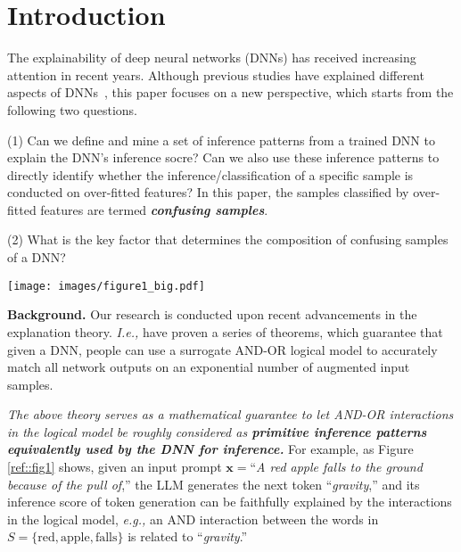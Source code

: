 \documentclass[10pt,twocolumn,letterpaper]{article}
\begin{document}
\section{Introduction}
The explainability of deep neural networks (DNNs) has received increasing attention in recent years. Although previous studies have explained different aspects of DNNs~\citep{dziugaite2017computing, foret2020sharpness, neyshabur2015norm}, this paper focuses on a new perspective, which starts from the following two questions.

(1) Can we define and mine a set of inference patterns from a trained DNN to explain the DNN's inference socre? Can we also use these inference patterns to directly identify whether the inference/classification of a specific sample is conducted on over-fitted features? In this paper, the samples classified by over-fitted features are termed \textbf{\textit{confusing samples}}.

(2) What is the key factor that determines the composition of confusing samples of a DNN?


\begin{figure*}[t]
    \centering
    \texttt{[image: images/figure1\_big.pdf]}
    \vspace{-5pt}
    \caption{\citet{ren2024we} have proven that we can construct a surrogate logical model $h(\mathbf{x})$ consisting of sparse AND-OR interactions, which can universally predict the DNN's inference scores $v(\mathbf{x})$ on an exponential number of masked states of the sample $\mathbf{x}$.}
    \vspace{-5pt}
    \label{ref::fig1}
\end{figure*}

\textbf{Background.} Our research is conducted upon recent advancements in the explanation theory. \emph{I.e.,} \citet{ren2024we} have proven a series of theorems, which guarantee that given a DNN, people can use a surrogate AND-OR logical model to accurately match all network outputs on an exponential number of augmented input samples.

\textit{The above theory serves as a mathematical guarantee to let AND-OR interactions in the logical model be roughly considered as \textbf{primitive inference patterns equivalently used by the DNN for inference.}} For example, as Figure \ref{ref::fig1} shows, given an input prompt $\mathbf{x}=$``\textit{A red apple falls to the ground because of the pull of},''
the LLM generates the next token ``\textit{gravity},'' and its inference score of token generation can be faithfully explained by the interactions in the logical model, \emph{e.g.,} an AND interaction between the words in $S=\{\text{red}, \text{apple}, \text{falls}\}$ is related to ``\textit{gravity}.''
\end{document}

